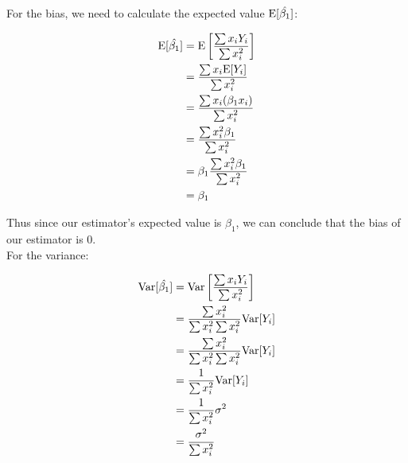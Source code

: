 \documentclass{article}
\begin{document}
\begin{homeworkProblem}
	\solution
	
	For the bias, we need to calculate the expected value
	\(\mathrm{E}[\hat{\beta_1}]\):
	
	\[
	\begin{split}
	\mathrm{E}[\hat{\beta_1}]
	&= \mathrm{E} \left[ \frac{
		\sum {x_i Y_i}
	}{
		\sum x_i^2
	}\right]
	\\
	&= \frac{
		\sum {x_i \mathrm{E}[Y_i]}
	}{
		\sum x_i^2
	}
	\\
	&= \frac{
		\sum {x_i (\beta_1 x_i)}
	}{
		\sum x_i^2
	}
	\\
	&= \frac{
		\sum {x_i^2 \beta_1}
	}{
		\sum x_i^2
	}
	\\
	&= \beta_1 \frac{
		\sum {x_i^2 \beta_1}
	}{
		\sum x_i^2
	}
	\\
	&= \beta_1
	\end{split}
	\]
	
	Thus since our estimator's expected value is \(\beta_1\), we can conclude
	that the bias of our estimator is 0.
	\\
	
	For the variance:
	
	\[
	\begin{split}
	\mathrm{Var}[\hat{\beta_1}]
	&= \mathrm{Var} \left[ \frac{
		\sum {x_i Y_i}
	}{
		\sum x_i^2
	}\right]
	\\
	&=
	\frac{
		\sum {x_i^2}
	}{
		\sum x_i^2 \sum x_i^2
	} \mathrm{Var}[Y_i]
	\\
	&=
	\frac{
		\sum {x_i^2}
	}{
		\sum x_i^2 \sum x_i^2
	} \mathrm{Var}[Y_i]
	\\
	&=
	\frac{
		1
	}{
		\sum x_i^2
	} \mathrm{Var}[Y_i]
	\\
	&=
	\frac{
		1
	}{
		\sum x_i^2
	} \sigma^2
	\\
	&=
	\frac{
		\sigma^2
	}{
		\sum x_i^2
	}
	\end{split}
	\]
	
\end{homeworkProblem}

\pagebreak
\end{document}
